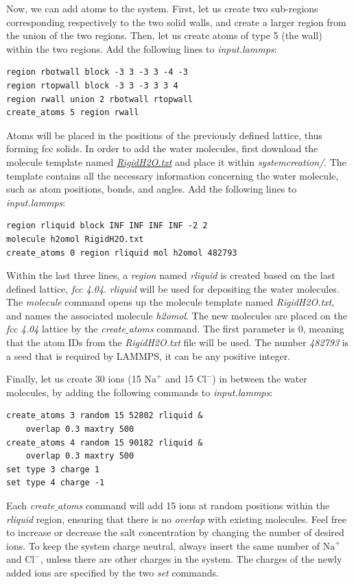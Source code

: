 \documentclass[9pt,tutorial]{livecoms}
\begin{document}
Now, we can add atoms to the system. First, let us create two sub-regions corresponding respectively to the two solid walls, and create a larger region from the union of the two regions. Then, let us create atoms of type 5 (the wall) within the two regions. Add the following lines to \textit{input.lammps}:
{\normalsize \begin{verbatim}
region rbotwall block -3 3 -3 3 -4 -3
region rtopwall block -3 3 -3 3 3 4
region rwall union 2 rbotwall rtopwall
create_atoms 5 region rwall
\end{verbatim}}
Atoms will be placed in the positions of the previously defined lattice, thus forming fcc solids. In order to add the water molecules, first download the molecule template named \href{https://raw.githubusercontent.com/lammpstutorials/lammpstutorials-article/main/files/tutorial4/RigidH2O.txt}{\textit{RigidH2O.txt}} and place it within \textit{systemcreation/}. The template contains all the
necessary information concerning the water molecule, such as atom positions, bonds, and angles. Add the following lines to \textit{input.lammps}:
{\normalsize \begin{verbatim}
region rliquid block INF INF INF INF -2 2
molecule h2omol RigidH2O.txt
create_atoms 0 region rliquid mol h2omol 482793
\end{verbatim}}
Within the last three lines, a \textit{region} named \textit{rliquid} is created based on the last defined lattice, \textit{fcc 4.04}. \textit{rliquid} will be used for depositing the water molecules. The \textit{molecule} command opens up the molecule template named
\textit{RigidH2O.txt}, and names the associated molecule \textit{h2omol}. The new molecules are placed on the \textit{fcc 4.04} lattice by the \textit{create$\_$atoms} command. The first parameter is 0, meaning that the atom IDs from the \textit{RigidH2O.txt} file will be used. The number \textit{482793} is a seed that is required by LAMMPS, it can be any positive integer.

Finally, let us create 30 ions (15 $\text{Na}^+$ and 15 $\text{Cl}^-$) in between the water molecules, by adding the following commands to \textit{input.lammps}:
{\normalsize \begin{verbatim}
create_atoms 3 random 15 52802 rliquid &
    overlap 0.3 maxtry 500
create_atoms 4 random 15 90182 rliquid &
    overlap 0.3 maxtry 500
set type 3 charge 1
set type 4 charge -1
\end{verbatim}}
Each \textit{create$\_$atoms} command will add 15 ions at random positions within the \textit{rliquid} region, ensuring that there is no \textit{overlap} with existing molecules. Feel free to increase or decrease the salt concentration by changing the number of desired ions. To keep the system charge neutral, always insert the same number of $\text{Na}^+$ and $\text{Cl}^-$, unless there are other charges in the system. The charges of the newly added ions are specified by the two \textit{set} commands.
\end{document}
